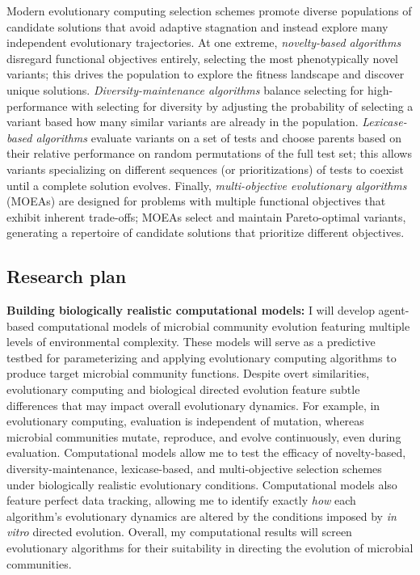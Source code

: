 Modern evolutionary computing selection schemes promote diverse populations of candidate solutions that avoid adaptive stagnation and instead explore many independent evolutionary trajectories.
At one extreme, \textit{novelty-based algorithms} disregard functional objectives entirely, selecting the most phenotypically novel variants; this drives the population to explore the fitness landscape and discover unique solutions.
\textit{Diversity-maintenance algorithms} balance selecting for high-performance with selecting for diversity by adjusting the probability of selecting a variant based how many similar variants are already in the population.
\textit{Lexicase-based algorithms} evaluate variants on a set of tests 
and choose parents based on their relative performance on random permutations of the full test set; this allows variants specializing on different sequences (or prioritizations) of tests to coexist until a complete solution evolves. 
Finally, \textit{multi-objective evolutionary algorithms} (MOEAs) are designed for problems with multiple functional objectives that exhibit inherent trade-offs; MOEAs select and maintain Pareto-optimal variants, generating a repertoire of candidate solutions that prioritize different objectives.

\vspace{-1em}
\subsection*{Research plan}
\vspace{-0.5em}

\noindent
\textbf{Building biologically realistic computational models:}
I will develop agent-based computational models of microbial community evolution featuring multiple levels of environmental complexity.
These models will serve as a predictive testbed for parameterizing and applying evolutionary computing algorithms to produce target microbial community functions. 
Despite overt similarities, evolutionary computing and biological directed evolution feature subtle differences that may impact overall evolutionary dynamics. 
For example, in evolutionary computing, evaluation is independent of mutation, whereas microbial communities mutate, reproduce, and evolve continuously, even during evaluation. 
Computational models allow me to test the efficacy of novelty-based, diversity-maintenance, lexicase-based, and multi-objective selection schemes under biologically realistic evolutionary conditions.
Computational models also feature perfect data tracking, allowing me to identify exactly \textit{how} each algorithm's evolutionary dynamics are altered by the conditions imposed by \textit{in vitro} directed evolution.
Overall, my computational results will screen evolutionary algorithms for their suitability in directing the evolution of microbial communities.

